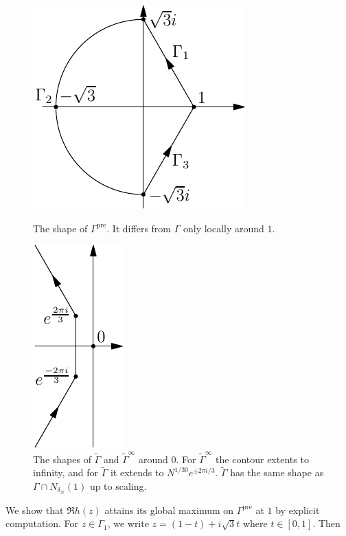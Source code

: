 \documentclass[11pt, a4paper]{article}
\numberwithin{equation}{section}
\DeclareMathOperator{\pre}{pre}
\theoremstyle{definition}
\theoremstyle{remark}
\begin{document}
\begin{figure}[ht]
  \begin{minipage}[t]{0.45\linewidth}
    \centering
    \includegraphics{Gamma_pre}
    \caption{The shape of $\Gamma^{\pre}$. It differs from $\Gamma$ only locally around $1$.}
    \label{fig:Gamma_pre}
  \end{minipage}
  \hfill
  \begin{minipage}[t]{0.45\linewidth}
    \centering
    \includegraphics{tilde_Gamma}
    \caption{The shapes of $\tilde{\Gamma}$ and $\tilde{\Gamma}^{\infty}$ around $0$. For $\tilde{\Gamma}^{\infty}$ the contour extents to infinity, and for $\tilde{\Gamma}$ it extends to $N^{1/30} e^{\pm 2\pi i/3}$. $\tilde{\Gamma}$ has the same shape as $\Gamma \cap N_{\delta_N}(1)$ up to scaling.}
    \label{fig:tilde_Gamma}
  \end{minipage}
\end{figure}
We show that $\Re h(z)$ attains its global maximum on $\Gamma^{\pre}$ at $1$  by explicit computation. For $z \in \Gamma_1$, we write $z = (1 - t) + i\sqrt{3}t$ where $t \in [0, 1]$. Then
\end{document}
